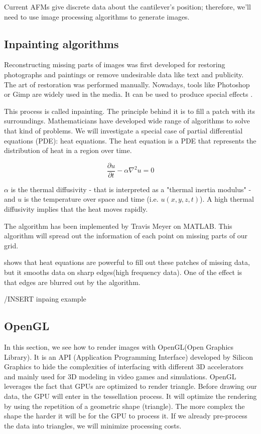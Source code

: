 Current AFMs give discrete data about the cantilever's position; therefore, we'll need to use image processing algorithms to generate images. 

\subsection{Inpainting algorithms}

Reconstructing missing parts of images was first developed for restoring photographs and paintings or remove undesirable data like text and publicity. The art of restoration was performed manually. Nowadays, tools like Photoshop or Gimp are widely used in the media. It can be used to produce special effects 
\cite{richard2001fast}.

This process is called inpainting. The principle behind it is to fill a patch with its surroundings. Mathematicians have developed wide range of algorithms to solve that kind of problems. We will investigate a special case of partial differential equations (PDE): heat equations. 
The heat equation is a PDE that represents the distribution of heat in a region over time. 

\begin{equation}\label{eqn:heateq}
\frac{\partial u}{\partial t} - \alpha \nabla^2 u = 0
\end{equation}


$\alpha$ is the thermal diffusivity - that is interpreted as a "thermal inertia modulus" - and $u$ is the temperature over space and time (i.e. $u(x,y,z,t)$). A high thermal diffusivity implies that the heat moves rapidly.

The algorithm has been implemented by Travis Meyer on MATLAB. This algorithm will spread out the information of each point on missing parts of our grid.

\cite{aubert2006mathematical} shows that heat equations are powerful to fill out these patches of missing data, but it smooths data on sharp edges(high frequency data). One of the effect is that edges are blurred out by the algorithm.

/INSERT inpaing example


\subsection{OpenGL}

In this section, we see how to render images with OpenGL(Open Graphics Library). It is an API (Application Programming Interface) developed by Silicon Graphics to hide the complexities of interfacing with different 3D accelerators and mainly used for 3D modeling in video games and simulations. OpenGL leverages the fact that GPUs are optimized to render triangle. Before drawing our data, the GPU will enter in the tessellation process. It will optimize the rendering by using the repetition of a geometric shape (triangle). The more complex the shape the harder it will be for the GPU to process it. If we already pre-process the data into triangles,  we will minimize processing costs. \cite{abobegpu}

